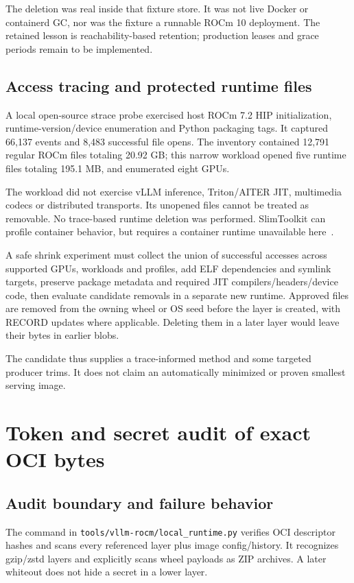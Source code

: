 \documentclass[11pt,a4paper]{article}
\newcommand{\file}[1]{\nolinkurl{#1}}
\newcommand{\term}[1]{\texttt{\detokenize{#1}}}
\begin{document}
The deletion was real inside that fixture store. It was not live Docker or
containerd GC, nor was the fixture a runnable ROCm 10 deployment. The retained
lesson is reachability-based retention; production leases and grace periods
remain to be implemented.

\subsection{Access tracing and protected runtime files}

A local open-source strace probe exercised host ROCm 7.2 HIP initialization,
runtime-version/device enumeration and Python packaging tags. It captured 66,137
events and 8,483 successful file opens. The inventory contained 12,791 regular
ROCm files totaling 20.92 GB; this narrow workload opened five runtime files
totaling 195.1 MB, and enumerated eight GPUs.

The workload did not exercise vLLM inference, Triton/AITER JIT, multimedia codecs
or distributed transports. Its unopened files cannot be treated as removable.
No trace-based runtime deletion was performed. SlimToolkit can profile container
behavior, but requires a container runtime unavailable here~\cite{slim,strace}.

A safe shrink experiment must collect the union of successful accesses across
supported GPUs, workloads and profiles, add ELF dependencies and symlink targets, preserve
package metadata and required JIT compilers/headers/device code, then evaluate
candidate removals in a separate new runtime. Approved files are removed from
the owning wheel or OS seed before the layer is created, with RECORD updates
where applicable. Deleting them in a later layer would leave their bytes in
earlier blobs.

The candidate thus supplies a trace-informed method and some targeted producer
trims. It does not claim an automatically minimized or proven smallest serving
image.

\section{Token and secret audit of exact OCI bytes}

\subsection{Audit boundary and failure behavior}

The \term{audit} command in \file{tools/vllm-rocm/local_runtime.py} verifies OCI
descriptor hashes and scans every referenced layer plus image config/history.
It recognizes gzip/zstd layers and explicitly scans wheel payloads as ZIP
archives. A later whiteout does not hide a secret in a lower layer.
\end{document}
